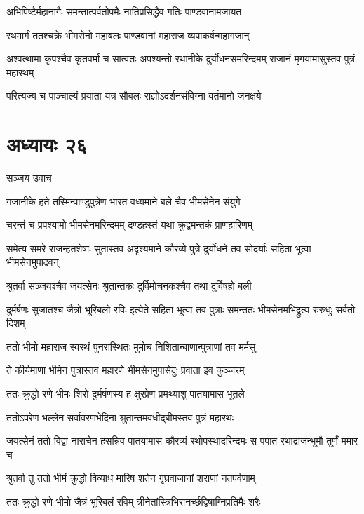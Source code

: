 \twolineshloka
{अभिपिष्टैर्महानागैः समन्तात्पर्वतोपमैः}
{नातिप्रसिद्धैव गतिः पाण्डवानामजायत}


\twolineshloka
{रथमार्गं ततश्चक्रे भीमसेनो महाबलः}
{पाण्डवानां महाराज व्यपाकर्षन्महागजान्}


\threelineshloka
{अश्वत्थामा कृपश्चैव कृतवर्मा च सात्वतः}
{अपश्यन्तो रथानीके दुर्योधनसमरिन्दमम्}
{राजानं मृगयामासुस्तव पुत्रं महारथम्}


\twolineshloka
{परित्यज्य च पाञ्चाल्यं प्रयाता यत्र सौबलः}
{राज्ञोऽदर्शनसंविग्ना वर्तमानो जनक्षये}


\chapter{अध्यायः २६}
\twolineshloka
{सञ्जय उवाच}
{}


\twolineshloka
{गजानीके हते तस्मिन्पाण्डुपुत्रेण भारत}
{वध्यमाने बले चैव भीमसेनेन संयुगे}


\twolineshloka
{चरन्तं च प्रपश्यामो भीमसेनमरिन्दमम्}
{दण्डहस्तं यथा क्रुद्वमन्तकं प्राणहारिणम्}


\threelineshloka
{समेत्य समरे राजन्हतशेषाः सुतास्तव}
{अदृश्यमाने कौरव्ये पुत्रे दुर्योधने तव}
{सोदर्याः सहिता भूत्वा भीमसेनमुपाद्रवन्}


\twolineshloka
{श्रुतर्वा सञ्जयश्चैव जयत्सेनः श्रुतान्तकः}
{दुर्विमोचनकश्चैव तथा दुर्विषहो बली}


\threelineshloka
{दुर्मर्षणः सुजातश्च जैत्रो भूरिबलो रविः}
{इत्येते सहिता भूत्वा तव पुत्राः समन्ततः}
{भीमसेनमभिद्रुत्य रुरुधुः सर्वतो दिशम्}


\twolineshloka
{ततो भीमो महाराज स्वरथं पुनरास्थितः}
{मुमोच निशितान्बाणान्पुत्राणां तव मर्मसु}


\twolineshloka
{ते कीर्यमाणा भीमेन पुत्रास्तव महारणे}
{भीमसेनमुपासेदुः प्रवाता इव कुञ्जरम्}


\twolineshloka
{ततः क्रुद्धो रणे भीमः शिरो दुर्मर्षणस्य ह}
{क्षुरप्रेण प्रमथ्याशु पातयामास भूतले}


\twolineshloka
{ततोऽपरेण भल्लेन सर्वावरणभेदिना}
{श्रुतान्तमवधीद्बीमस्तव पुत्रं महारथः}


\threelineshloka
{जयत्सेनं ततो विद्वा नाराचेन हसन्निव}
{पातयामास कौरव्यं रथोपस्थादरिन्दमः}
{स पपात रथाद्राजन्भूमौ तूर्णं ममार च}


\twolineshloka
{श्रुतर्वा तु ततो भीमं क्रुद्धो विव्याध मारिष}
{शतेन गृघ्रवाजानां शराणां नतपर्वणाम्}


\twolineshloka
{ततः क्रुद्धो रणे भीमो जैत्रं भूरिबलं रविम्}
{त्रीनेतांस्त्रिभिरानर्च्छद्विषाग्निप्रतिमैः शरैः}


